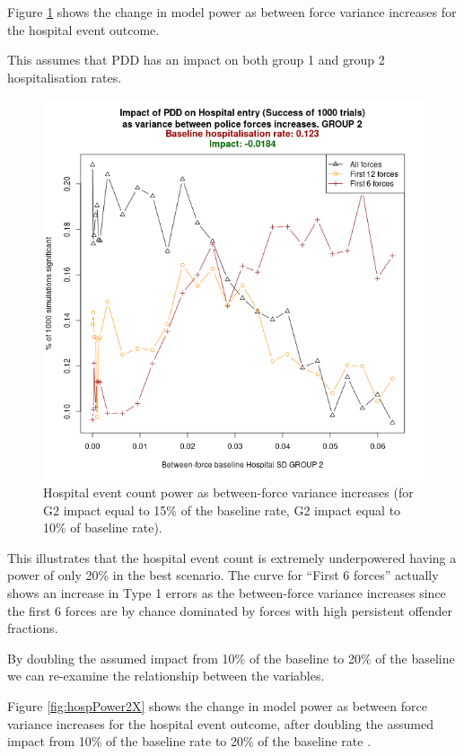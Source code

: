 \documentclass[
]{article}
\begin{document}
Figure \ref{fig:hospPower} shows the change in model power as between force variance increases for the hospital event outcome.

This assumes that PDD has an impact on both group 1 and group 2 hospitalisation rates.

\begin{figure}

{\centering \includegraphics[width=0.8\linewidth]{figures/hospital_vs_pf_original_g2} 

}

\caption{Hospital event count power as between-force variance increases (for G2 impact equal to 15\% of the baseline rate, G2 impact equal to 10\% of baseline rate).}\label{fig:hospPower}
\end{figure}

This illustrates that the hospital event count is extremely underpowered having a power of only 20\% in the best scenario. The curve for ``First 6 forces'' actually shows an increase in Type 1 errors as the between-force variance increases since the first 6 forces are by chance dominated by forces with high persistent offender fractions.

By doubling the assumed impact from 10\% of the baseline to 20\% of the baseline we can re-examine the relationship between the variables.

Figure \ref{fig:hospPower2X} shows the change in model power as between force variance increases for the hospital event outcome, after doubling the assumed impact from 10\% of the baseline rate to 20\% of the baseline rate .
\end{document}
